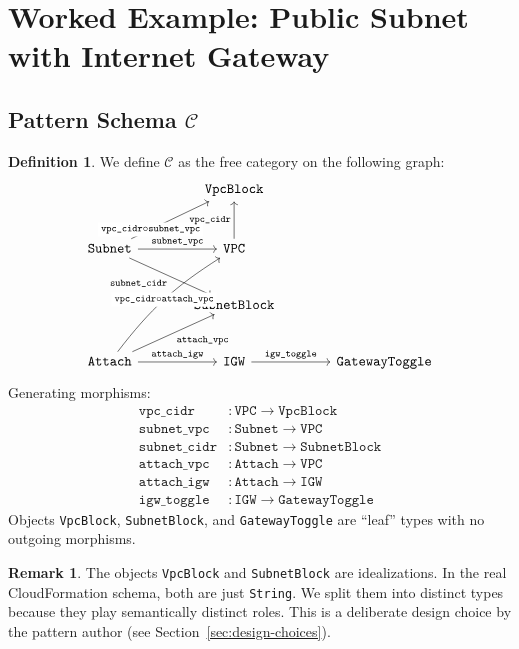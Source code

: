 \documentclass[11pt,a4paper]{article}
\theoremstyle{definition}
\newtheorem{definition}{Definition}[section]
\newtheorem{remark}{Remark}[section]
\theoremstyle{plain}
\begin{document}
\section{Worked Example: Public Subnet with Internet Gateway}

\subsection{Pattern Schema \texorpdfstring{$\mathcal{C}$}{C}}

\begin{definition}
We define $\mathcal{C}$ as the free category on the following graph:
\[
\begin{tikzcd}[column sep=large, row sep=large]
& \texttt{VpcBlock} \\
\texttt{Subnet} \arrow[ru, "\texttt{vpc\_cidr} \circ \texttt{subnet\_vpc}"{description, near start}] \arrow[r, "\texttt{subnet\_vpc}"] \arrow[rd, "\texttt{subnet\_cidr}"'] & \texttt{VPC} \arrow[u, "\texttt{vpc\_cidr}"] \\
& \texttt{SubnetBlock} \\
\texttt{Attach} \arrow[ruu, bend left=10, "\texttt{vpc\_cidr} \circ \texttt{attach\_vpc}"{description}] \arrow[ru, "\texttt{attach\_vpc}"'] \arrow[r, "\texttt{attach\_igw}"] & \texttt{IGW} \arrow[r, "\texttt{igw\_toggle}"] & \texttt{GatewayToggle}
\end{tikzcd}
\]
Generating morphisms:
\begin{align*}
\texttt{vpc\_cidr}   &\colon \texttt{VPC} \to \texttt{VpcBlock} \\
\texttt{subnet\_vpc} &\colon \texttt{Subnet} \to \texttt{VPC} \\
\texttt{subnet\_cidr}&\colon \texttt{Subnet} \to \texttt{SubnetBlock} \\
\texttt{attach\_vpc} &\colon \texttt{Attach} \to \texttt{VPC} \\
\texttt{attach\_igw} &\colon \texttt{Attach} \to \texttt{IGW} \\
\texttt{igw\_toggle} &\colon \texttt{IGW} \to \texttt{GatewayToggle}
\end{align*}
Objects \texttt{VpcBlock}, \texttt{SubnetBlock}, and \texttt{GatewayToggle} are ``leaf'' types with no outgoing morphisms.
\end{definition}

\begin{remark}
The objects \texttt{VpcBlock} and \texttt{SubnetBlock} are idealizations. In the real CloudFormation schema, both are just \texttt{String}. We split them into distinct types because they play semantically distinct roles. This is a deliberate design choice by the pattern author (see Section~\ref{sec:design-choices}).
\end{remark}
\end{document}
